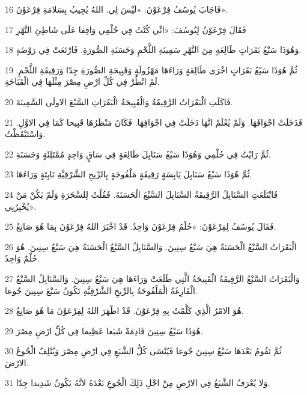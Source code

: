 \par 16 فَاجَابَ يُوسُفُ فِرْعَوْنَ: «لَيْسَ لِي. اللهُ يُجِيبُ بِسَلامَةِ فِرْعَوْنَ».
\par 17 فَقَالَ فِرْعَوْنُ لِيُوسُفَ: «انِّي كُنْتُ فِي حُلْمِي وَاقِفا عَلَى شَاطِئِ النَّهْرِ
\par 18 وَهُوَذَا سَبْعُ بَقَرَاتٍ طَالِعَةٍ مِنَ النَّهْرِ سَمِينَةِ اللَّحْمِ وَحَسَنَةِ الصُّورَةِ. فَارْتَعَتْ فِي رَوْضَةٍ.
\par 19 ثُمَّ هُوَذَا سَبْعُ بَقَرَاتٍ اخْرَى طَالِعَةٍ وَرَاءَهَا مَهْزُولَةٍ وَقَبِيحَةِ الصُّورَةِ جِدّا وَرَقِيقَةِ اللَّحْمِ. لَمْ انْظُرْ فِي كُلِّ ارْضِ مِصْرَ مِثْلَهَا فِي الْقَبَاحَةِ.
\par 20 فَاكَلَتِ الْبَقَرَاتُ الرَّقِيقَةُ وَالْقَبِيحَةُ الْبَقَرَاتِ السَّبْعَ الاولَى السَّمِينَةَ.
\par 21 فَدَخَلَتْ اجْوَافَهَا. وَلَمْ يُعْلَمْ انَّهَا دَخَلَتْ فِي اجْوَافِهَا. فَكَانَ مَنْظَرُهَا قَبِيحا كَمَا فِي الاوَّلِ. وَاسْتَيْقَظْتُ.
\par 22 ثُمَّ رَايْتُ فِي حُلْمِي وَهُوَذَا سَبْعُ سَنَابِلَ طَالِعَةٍ فِي سَاقٍ وَاحِدٍ مُمْتَلِئَةٍ وَحَسَنَةِ.
\par 23 ثُمَّ هُوَذَا سَبْعُ سَنَابِلَ يَابِسَةٍ رَقِيقَةٍ مَلْفُوحَةٍ بِالرِّيحِ الشَّرْقِيَّةِ نَابِتَةٍ وَرَاءَهَا.
\par 24 فَابْتَلَعَتِ السَّنَابِلُ الرَّقِيقَةُ السَّنَابِلَ السَّبْعَ الْحَسَنَةَ. فَقُلْتُ لِلسَّحَرَةِ وَلَمْ يَكُنْ مَنْ يُخْبِرُنِي».
\par 25 فَقَالَ يُوسُفُ لِفِرْعَوْنَ: «حُلْمُ فِرْعَوْنَ وَاحِدٌ. قَدْ اخْبَرَ اللهُ فِرْعَوْنَ بِمَا هُوَ صَانِعٌ.
\par 26 الْبَقَرَاتُ السَّبْعُ الْحَسَنَةُ هِيَ سَبْعُ سِنِينَ. وَالسَّنَابِلُ السَّبْعُ الْحَسَنَةُ هِيَ سَبْعُ سِنِينَ. هُوَ حُلْمٌ وَاحِدٌ.
\par 27 وَالْبَقَرَاتُ السَّبْعُ الرَّقِيقَةُ الْقَبِيحَةُ الَّتِي طَلَعَتْ وَرَاءَهَا هِيَ سَبْعُ سِنِينَ. وَالسَّنَابِلُ السَّبْعُ الْفَارِغَةُ الْمَلْفُوحَةُ بِالرِّيحِ الشَّرْقِيَّةِ تَكُونُ سَبْعَ سِنِينَ جُوعا.
\par 28 هُوَ الامْرُ الَّذِي كَلَّمْتُ بِهِ فِرْعَوْنَ. قَدْ اظْهَرَ اللهُ لِفِرْعَوْنَ مَا هُوَ صَانِعٌ.
\par 29 هُوَذَا سَبْعُ سِنِينَ قَادِمَةٌ شَبَعا عَظِيما فِي كُلِّ ارْضِ مِصْرَ.
\par 30 ثُمَّ تَقُومُ بَعْدَهَا سَبْعُ سِنِينَ جُوعا فَيُنْسَى كُلُّ الشَّبَعِ فِي ارْضِ مِصْرَ وَيُتْلِفُ الْجُوعُ الارْضَ.
\par 31 وَلا يُعْرَفُ الشَّبَعُ فِي الارْضِ مِنْ اجْلِ ذَلِكَ الْجُوعِ بَعْدَهُ لانَّهُ يَكُونُ شَدِيدا جِدّا.
